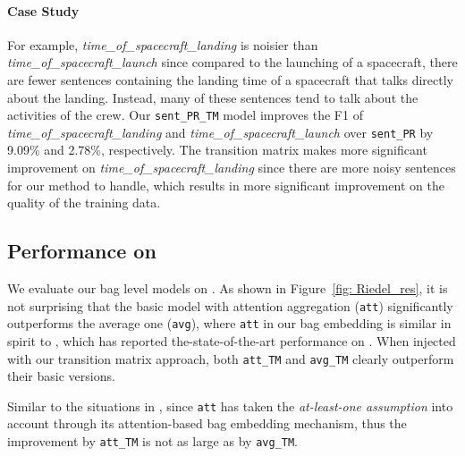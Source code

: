 \paragraph{Case Study}
 For example, \textit{time\_of\_spacecraft\_landing} is noisier than \textit{time\_of\_spacecraft\_launch} since compared to the launching of a spacecraft, there are fewer sentences containing the landing time of a spacecraft that talks directly about the landing. Instead, many of these sentences tend to talk about the activities of the crew. Our \texttt{sent\_PR\_TM} model improves the F1 of \textit{time\_of\_spacecraft\_landing} and \textit{time\_of\_spacecraft\_launch} over \texttt{sent\_PR} by 9.09\% and 2.78\%, respectively. 
The transition matrix makes more significant improvement on \textit{time\_of\_spacecraft\_landing} since there are more noisy sentences for our method to handle, which results in more significant improvement on the quality of the training data.


\subsection{Performance on \EntityRE}
We evaluate our bag level models on \EntityRE. 
As shown in Figure~\ref{fig: Riedel_res}, it is not surprising that the basic model with attention aggregation (\texttt{att}) significantly outperforms the average one (\texttt{avg}), where \texttt{att}  in our bag embedding is similar in spirit to \cite{lin2016neural},
which has reported the-state-of-the-art performance on \EntityRE.  
When injected with our transition matrix approach,  both \texttt{att\_TM} and \texttt{avg\_TM} clearly outperform their basic versions.

Similar to the situations in \TimeRE, since \texttt{att} has taken the \textit{at-least-one assumption} into account  through its attention-based bag embedding mechanism, thus the improvement by \texttt{att\_TM}  is not as large as by \texttt{avg\_TM}.

